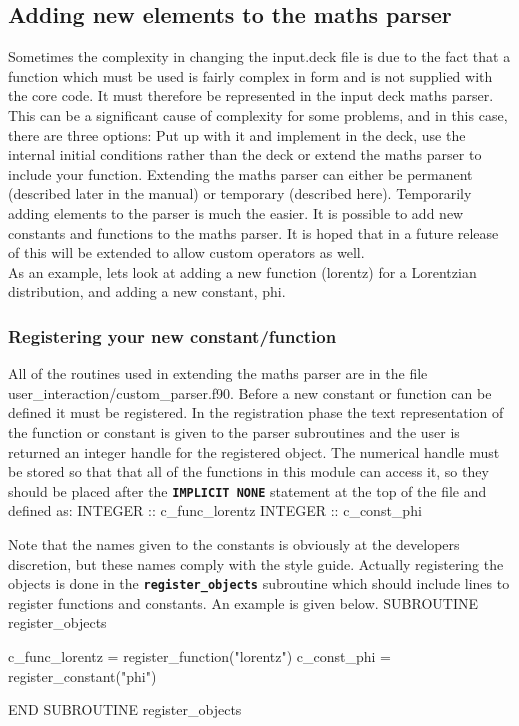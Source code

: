 \documentclass[12pt,a4paper]{article}
\newcommand{\inlinecode}[1]{{\color{warwickred} \bf\texttt{#1}}}
\newcommand{\EPOCH}{{\color{warwickdark}\fontfamily{phv}\selectfont{EPOCH}}}
\newenvironment{boxverbatim}{\lboxverbatim{none}}{\endlboxverbatim}
\begin{document}
\subsection{Adding new elements to the maths parser}
Sometimes the complexity in changing the input.deck file is due to the fact that
a function which must be used is fairly complex in form and is not supplied
with the core code. It must therefore be represented in the input deck maths
parser. This can be a significant cause of complexity for some problems, and
in this case, there are three options: Put up with it and implement in the
deck, use the internal initial conditions rather than the deck or extend the
maths parser to include your function. Extending the maths parser can either
be permanent (described later in the manual) or temporary (described
here). Temporarily adding elements to the parser is much the easier. It is
possible to add new constants and functions to the maths parser. It is hoped
that in a future release of {\EPOCH} this will be extended to allow custom
operators as well.\\

As an example, lets look at adding a new function (lorentz) for a
Lorentzian distribution, and adding a new constant, phi.

\subsubsection{Registering your new constant/function}
All of the routines used in extending the maths parser are in the file
user\_interaction/custom\_parser.f90.  Before a new constant or function
can be defined it must be registered. In the registration phase the text
representation of the function or constant is given to the parser subroutines
and the user is returned an integer handle for the registered object. The
numerical handle must be stored so that that all of the functions in this
module can access it, so they should be placed after the \inlinecode{IMPLICIT
NONE} statement at the top of the file and defined as:
\begin{boxverbatim}
INTEGER :: c_func_lorentz
INTEGER :: c_const_phi
\end{boxverbatim}

Note that the names given to the constants is obviously at the developers
discretion, but these names comply with the {\EPOCH} style guide.
Actually registering the objects is done in the \inlinecode{register\_objects}
subroutine which should include lines to register functions and constants.
An example is given below.
\begin{boxverbatim}
SUBROUTINE register_objects

  c_func_lorentz = register_function("lorentz")
  c_const_phi = register_constant("phi")

END SUBROUTINE register_objects
\end{boxverbatim}
\end{document}
